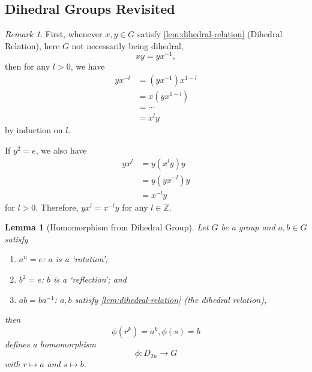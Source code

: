 \documentclass{article}
\newtheorem{lemma}[theorem]{Lemma}
\theoremstyle{definition}
\theoremstyle{remark}
\newtheorem{remark}[theorem]{Remark}
\newcommand{\pqty}[1]{\left(#1\right)}
\newcommand{\functiondomain}[3]{#1:#2\to #3}
\newcommand{\inverse}{^{-1}}
\newcommand{\ZZ}{\mathbb{Z}}
\begin{document}
\subsection{Dihedral Groups Revisited}
\label{sec:dihedral-group-revisited}
\begin{remark}
    First, whenever \(x, y \in G\) satisfy \autoref{lem:dihedral-relation} (Dihedral Relation), here \(G\) not necessarily being dihedral,
    \[
        xy = y x\inverse,
    \]
    then for any \(l > 0\), we have
    \begin{align*}
        y x^{-l} &= \pqty{y x \inverse} x^{1 - l} \\
        &= x \pqty{y x^{1 - l}} \\
        &= \cdots\\
        &= x^l y
    \end{align*}
    by induction on \(l\).

    If \(y^2 = e\), we also have
    \begin{align*}
        y x^l &= y \pqty{x^l y} y \\
        &= y \pqty{y x^{-l}} y \\
        &= x^{-l} y
    \end{align*}
    for \(l > 0\). Therefore, \(y x^l = x^{-l} y\) for any \(l \in \ZZ\).
\end{remark}

\begin{lemma}[Homomorphism from Dihedral Group]
    \label{lem:homomorphism-dihedral-group}
    Let \(G\) be a group and \(a, b \in G\) satisfy
    \begin{enumerate}
        \item \(a^n = e\): \(a\) is a `rotation';
        \item \(b^2 = e\): \(b\) is a `reflection'; and
        \item \(ab = b a\inverse\): \(a, b\) satisfy \autoref{lem:dihedral-relation} (the dihedral relation),
    \end{enumerate}
    then
    \[
    \phi \pqty{r^k} = a^k, \phi \pqty{s} = b
    \]
    defines a homomorphism
    \[
        \functiondomain{\phi}{D_{2n}}{G}
    \]
    with \(r \mapsto a\) and \(s \mapsto b\).
\end{lemma}
\end{document}
